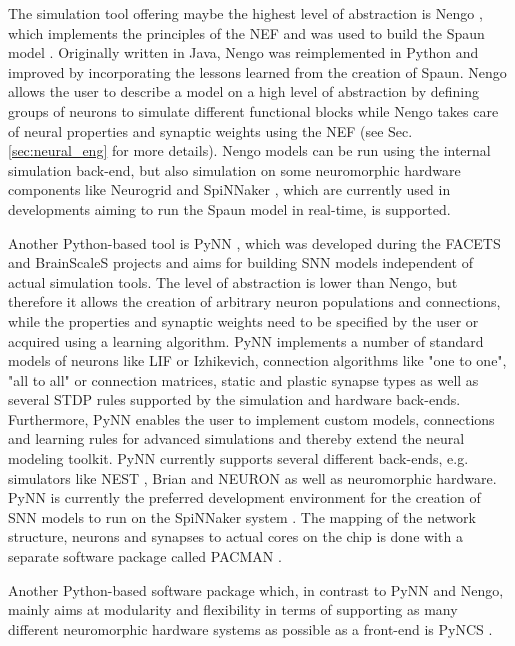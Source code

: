 The simulation tool offering maybe the highest level of abstraction is \ac{Nengo} \cite{Stewart2009}, which implements the principles of the \ac{NEF} \cite{Eliasmith2003} and was used to build the \ac{Spaun} model \cite{Eliasmith2012}.
Originally written in Java, \ac{Nengo} was reimplemented in Python \cite{Bekolay2014} and improved by incorporating the lessons learned from the creation of \ac{Spaun}.
\ac{Nengo} allows the user to describe a model on a high level of abstraction by defining groups of neurons to simulate different functional blocks while \ac{Nengo} takes care of neural properties and synaptic weights using the \ac{NEF} (see Sec. \ref{sec:neural_eng} for more details).
\ac{Nengo} models can be run using the internal simulation back-end, but also simulation on some neuromorphic hardware components like Neurogrid \cite{Dethier2011, Choudhary2012} and \ac{SpiNNaker} \cite{Mundy2015}, which are currently used in developments aiming to run the \ac{Spaun} model in real-time, is supported.

Another Python-based tool is \ac{PyNN} \cite{Davies2010}, which was developed during the \ac{FACETS} \cite{FACETS-proj} and \ac{BrainScaleS} \cite{BrainScaleS-proj} projects and aims for building \ac{SNN} models independent of actual simulation tools.
The level of abstraction is lower than \ac{Nengo}, but therefore it allows the creation of arbitrary neuron populations and connections, while the properties and synaptic weights need to be specified by the user or acquired using a learning algorithm.
\ac{PyNN} implements a number of standard models of neurons like \ac{LIF} or Izhikevich, connection algorithms like "one to one", "all to all" or connection matrices, static and plastic synapse types as well as several \ac{STDP} rules supported by the simulation and hardware back-ends.
Furthermore, \ac{PyNN} enables the user to implement custom models, connections and learning rules for advanced simulations and thereby extend the neural modeling toolkit.
\ac{PyNN} currently supports several different back-ends, e.g. simulators like \ac{NEST} \cite{Gewaltig2007}, Brian \cite{Goodman2009} and NEURON  \cite{Carnevale2009} as well as neuromorphic hardware.
\ac{PyNN} is currently the preferred development environment for the creation of \ac{SNN} models to run on the \ac{SpiNNaker} system \cite{Furber2014}.
The mapping of the network structure, neurons and synapses to actual cores on the chip is done with a separate software package called \ac{PACMAN} \cite{Galluppi2012}.

Another Python-based software package which, in contrast to \ac{PyNN} and \ac{Nengo}, mainly aims at modularity and flexibility in terms of supporting as many different neuromorphic hardware systems as possible as a front-end is \ac{PyNCS} \cite{Stefanini2014}.

